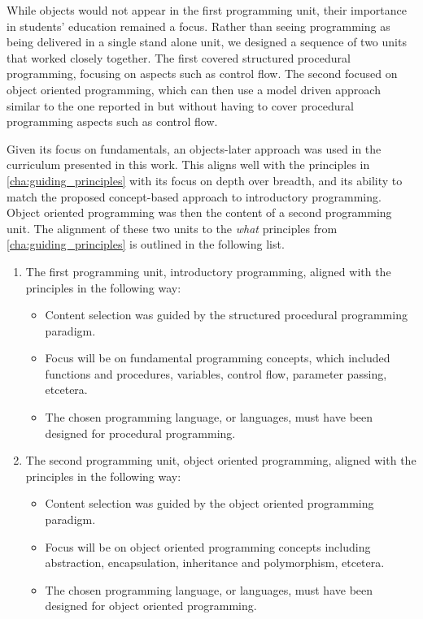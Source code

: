 While objects would not appear in the first programming unit, their importance in students' education remained a focus. Rather than seeing programming as being delivered in a single stand alone unit, we designed a sequence of two units that worked closely together. The first covered structured procedural programming, focusing on aspects such as control flow. The second focused on object oriented programming, which can then use a model driven approach similar to the one reported in \citet{Bennedsen:2004} but without having to cover procedural programming aspects such as control flow.

Given its focus on fundamentals, an objects-later approach was used in the curriculum presented in this work. This aligns well with the principles in \cref{cha:guiding_principles} with its focus on depth over breadth, and its ability to match the proposed concept-based approach to introductory programming. Object oriented programming was then the content of a second programming unit. The alignment of these two units to the \emph{what} principles from \cref{cha:guiding_principles} is outlined in the following list.
\begin{enumerate}
	\item The first programming unit, introductory programming, aligned with the principles in the following way:
	\begin{itemize}[noitemsep,nolistsep]
		\item Content selection was guided by the structured procedural programming paradigm.
		\item Focus will be on fundamental programming concepts, which included functions and procedures, variables, control flow, parameter passing, etcetera.
		\item The chosen programming language, or languages, must have been designed for procedural programming.
	\end{itemize}
	\item The second programming unit, object oriented programming, aligned with the principles in the following way:
	\begin{itemize}[noitemsep,nolistsep]
		\item Content selection was guided by the object oriented programming paradigm.
		\item Focus will be on object oriented programming concepts including abstraction, encapsulation, inheritance and polymorphism, etcetera.
		\item The chosen programming language, or languages, must have been designed for object oriented programming.
	\end{itemize}
\end{enumerate}



